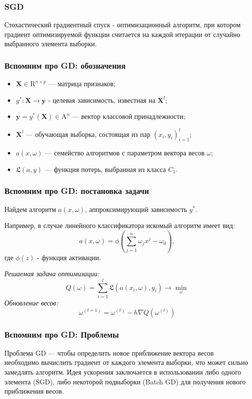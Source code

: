\documentclass[11pt]{beamer}
\begin{document}
	\begin{frame}
		\frametitle{SGD}
		Стохастический градиентный спуск - оптимизационный алгоритм, при котором градиент оптимизируемой функции считается на каждой итерации от случайно выбранного элемента выборки.
	\end{frame}
	\begin{frame}
		\frametitle{Вспомним про GD: обозначения}
		\begin{itemize}
			\item $ \bm{X} \in \mathrm{R}^{n\times p} $ --- матрица признаков;
			\item $ y^*:\bm{X}\rightarrow\bm{y} $ - целевая зависимость, известная на $ \bm{X}^l $;
			\item $ \bm{y} = y^*(\bm{X}) \in  \mathrm{A}^n $ --- вектор классовой принадлежности;
			\item $ \bm{X}^l $ --- обучающая выборка, состоящая из пар $ (x_i, y_i)_{i=1}^l $;
			\item $ a(x, \omega) $ --- семейство алгоритмов с параметром вектора весов $ \omega $;
			\item $ \mathfrak{L}(a, y) $ --- функция потерь, выбранная из класса $ C_1 $.
			
		\end{itemize}
		
	\end{frame}
	
	\begin{frame}
		\frametitle{Вспомним про GD: постановка задачи}
		Найдем алгоритм $ a(x, \omega) $, аппроксимирующий зависимость $ y^* $.
		
		Например, в случае линейного классификатора искомый алгоритм имеет вид:
		$$ a(x, \omega) = \phi(\sum\limits_{j=1}^n \omega_jx^j - \omega_0), $$где $ \phi(z) $ - функция активации. 
		
		\textit{Решаемая задача оптимизации:}
		$$ Q(\omega) = \sum\limits_{i=1}^{l}\mathfrak{L}(a(x_i, \omega), y_i)\rightarrow\min\limits_{\omega} $$
		\textit{Обновление весов:}
		$$ \omega^{(t+1)} = \omega^{(t)} - h\nabla Q(\omega^{(t)}) $$
		
	\end{frame}

	
	\begin{frame}
		\frametitle{Вспомним про GD: Проблемы}
		Проблема GD --- чтобы определить новое приближение вектора весов необходимо вычислить градиент от каждого элемента выборки, что может сильно замедлять алгоритм.
		Идея ускорения заключается в использовании либо одного элемента (SGD), либо некоторой подвыборки (Batch GD) для получения нового приближения весов. 
		
		
		
	\end{frame}
\end{document}
